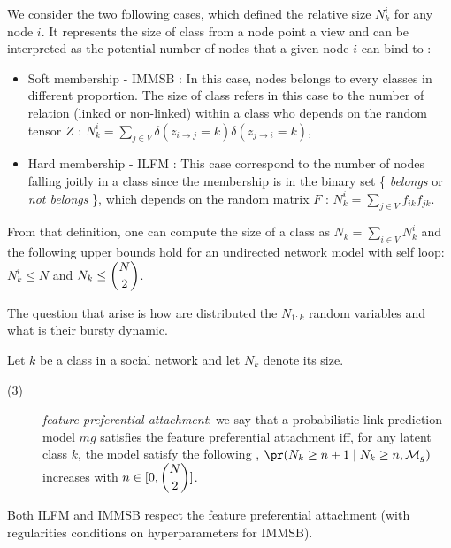 We consider the two following cases, which defined the relative size $N_k^i$ for any node $i$. It represents the size of class from a node point a view and can be interpreted as the potential number of nodes that a given node $i$ can bind to :
\begin{itemize}
    \item Soft membership - IMMSB : In this case, nodes belongs to every classes in different proportion. The size of class refers in this case to the number of relation (linked or non-linked) within a class who depends on the random tensor $Z$ : $N_k^i = \sum_{j \in V} \delta(z_{i\rightarrow j}=k)\delta(z_{j\rightarrow i}=k)$,
    \item Hard membership - ILFM : This case correspond to the number of nodes falling joitly in a class since the membership is in the binary set \{ \emph{belongs} or \emph{not belongs} \}, which depends on the random matrix $F$ : $N_k^i = \sum_{j\in V} f_{ik}f_{jk}$.
\end{itemize}

From that definition, one can compute the size of a class as $N_k = \sum_{i\in V} N_k^i$ and the following upper bounds hold for an undirected network model with self loop: $N_k^i \leq N$ and $N_k \leq \dbinom{N}{2}$.

The question that arise is how are distributed the $N_{1:k}$ random variables and what is their bursty dynamic.

\begin{definition}
Let $k$ be a class in a social network and let $N_k$ denote its size. 
\begin{description}
    \item[(3)] \emph{feature preferential attachment}: we say that a probabilistic link prediction model $mg$ satisfies the feature preferential attachment iff, for any latent class $k$, the model satisfy the following , $\pr(N_k \ge n+1 \mid N_k \ge n, \mathcal{M}_g)$ increases with $n \in [0,\dbinom{N}{2}]$.
\end{description}
\label{def:burst-soc-net2}
\end{definition}


\begin{proposition}
Both ILFM and IMMSB respect the feature preferential attachment (with regularities conditions on hyperparameters for IMMSB).	
\end{proposition}

